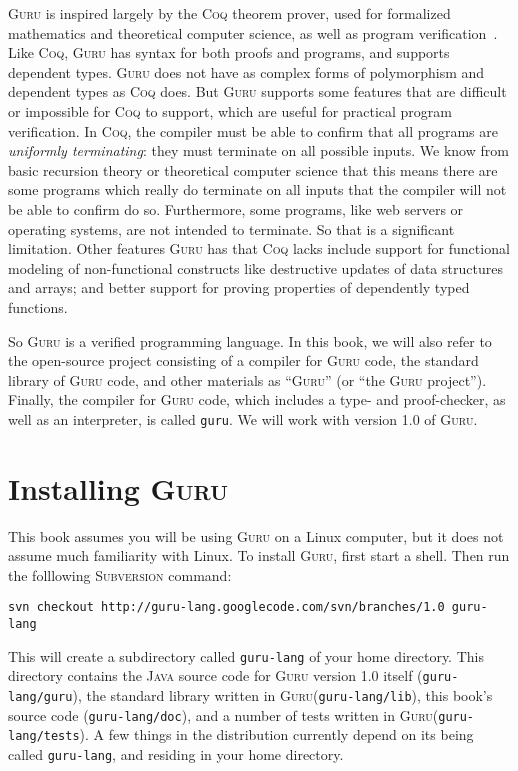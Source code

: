 \documentclass{book}[12pt]
\newcommand{\guru}[0]{\textsc{Guru}\xspace}
\begin{document}
\guru is inspired largely by the \textsc{Coq} theorem prover, used
for formalized mathematics and theoretical computer science, as well
as program verification~\cite{coq,coqart}.  Like \textsc{Coq}, \guru has
syntax for both proofs and programs, and supports dependent types.
\guru does not have as complex forms of polymorphism and dependent
types as \textsc{Coq} does. But \guru supports some features that are
difficult or impossible for \textsc{Coq} to support, which are useful
for practical program verification.  In \textsc{Coq}, the compiler
must be able to confirm that all programs are \emph{uniformly
terminating}: they must terminate on all possible inputs.  We know
from basic recursion theory or theoretical computer science that this
means there are some programs which really do terminate on all inputs
that the compiler will not be able to confirm do so.  Furthermore,
some programs, like web servers or operating systems, are not intended
to terminate.  So that is a significant limitation.  Other features
\guru has that \textsc{Coq} lacks include support for functional
modeling of non-functional constructs like destructive updates of data
structures and arrays; and better support for proving properties of
dependently typed functions.

So \guru is a verified programming language.  In this book, we will
also refer to the open-source project consisting of a compiler for
\guru code, the standard library of \guru code, and other materials
as ``\guru'' (or ``the \guru project'').  Finally, the compiler for
\guru code, which includes a type- and proof-checker, as well as an
interpreter, is called \texttt{guru}.  We will work with version 1.0
of \guru.

\section{Installing \guru}

This book assumes you will be using \guru on a Linux computer, but it
does not assume much familiarity with Linux.  To install \guru, first
start a shell. Then run the folllowing \textsc{Subversion} command:

\begin{verbatim}
svn checkout http://guru-lang.googlecode.com/svn/branches/1.0 guru-lang
\end{verbatim}

\noindent This will create a subdirectory called \texttt{guru-lang} of
your home directory.  This directory contains the \textsc{Java} source
code for \guru version 1.0 itself (\texttt{guru-lang/guru}), the
standard library written in \guru (\texttt{guru-lang/lib}), this
book's source code (\texttt{guru-lang/doc}), and a number of tests
written in \guru (\texttt{guru-lang/tests}).  A few things in the
distribution currently depend on its being called \texttt{guru-lang},
and residing in your home directory.
\end{document}
